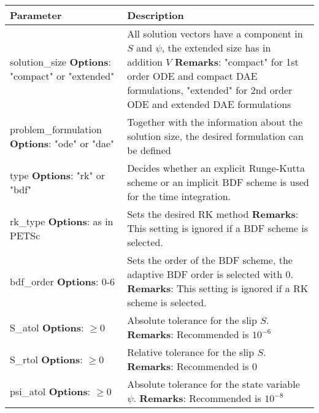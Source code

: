 	\begin{tabularx}{\textwidth}{| >{\raggedright\arraybackslash}m{} | >{\raggedright\arraybackslash}X |}
		\hline
		Parameter & Description \\
		\hline \hline
		solution\_size       \newline \textbf{Options}: "compact" or "extended"
		& All solution vectors have a component in $S$ and $\psi$, the extended size has in addition $V$ \newline \textbf{Remarks}: "compact" for 1st order ODE and compact DAE formulations, "extended" for 2nd order ODE and extended DAE formulations \\ \hline
		problem\_formulation \newline \textbf{Options}: "ode" or "dae" 
		& Together with the information about the solution size, the desired formulation can be defined \\ \hline 
		type                 \newline \textbf{Options}: "rk" or "bdf" 
		& Decides whether an explicit Runge-Kutta scheme or an implicit BDF scheme is used for the time integration. \\ \hline
		rk\_type             \newline \textbf{Options}: as in PETSc 
		& Sets the desired RK method \newline \textbf{Remarks}: This setting is ignored if a BDF scheme is selected. \\ \hline 
		bdf\_order           \newline \textbf{Options}: 0-6 
		& Sets the order of the BDF scheme, the adaptive BDF order is selected with 0. \newline \textbf{Remarks}: This setting is ignored if a RK scheme is selected. \\ \hline 
		S\_atol              \newline \textbf{Options}: $\ge0$
		& Absolute tolerance for the slip $S$. \newline \textbf{Remarks}: Recommended is $10^{-6}$  \\ \hline 
		S\_rtol              \newline \textbf{Options}: $\ge0$
		& Relative tolerance for the slip $S$. \newline \textbf{Remarks}: Recommended is $0$ \\ \hline 
		psi\_atol            \newline \textbf{Options}: $\ge0$
		& Absolute tolerance for the state variable $\psi$. \newline \textbf{Remarks}: Recommended is $10^{-8}$ \\ \hline 

\end{tabularx}
